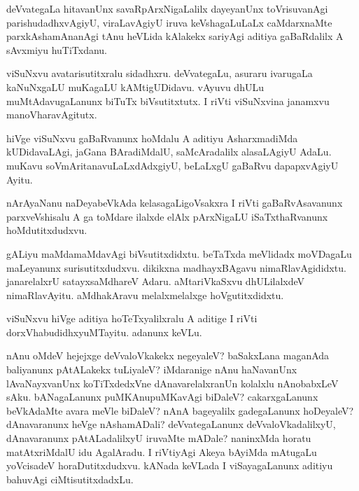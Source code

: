 \begin{mng}
deVvategaLa hitavanUnx savaRpArxNigaLalilx dayeyanUnx toVrisuvanAgi parishudadhxvAgiyU, viraLavAgiyU iruva keVshagaLuLaLx caMdarxnaMte parxkAshamAnanAgi tAnu heVLida kAlakekx sariyAgi aditiya gaBaRdalilx A sAvxmiyu huTiTxdanu.
\end{mng}

\begin{mng}
viSuNxvu avatarisutitxralu sidadhxru. deVvategaLu, asuraru ivarugaLa kaNuNxgaLU muKagaLU kAMtigUDidavu. vAyuvu dhULu muMtAdavugaLanunx biTuTx biVsutitxtutx. I riVti viSuNxvina janamxvu manoVharavAgitutx.
\end{mng}

\begin{mng}
hiVge viSuNxvu gaBaRvanunx hoMdalu A aditiyu AsharxmadiMda kUDidavaLAgi, jaGana BAradiMdalU, saMcAradalilx alasaLAgiyU AdaLu. muKavu soVmAritanavuLaLxdAdxgiyU, beLaLxgU gaBaRvu dapapxvAgiyU Ayitu.
\end{mng}

\begin{mng}
nArAyaNanu naDeyabeVkAda kelasagaLigoVsakxra I riVti gaBaRvAsavanunx parxveVshisalu A ga toMdare ilalxde elAlx pArxNigaLU iSaTxthaRvanunx hoMdutitxdudxvu.
\end{mng}

\begin{mng}
gALiyu maMdamaMdavAgi biVsutitxdidxtu. beTaTxda meVlidadx moVDagaLu maLeyanunx surisutitxdudxvu. dikikxna madhayxBAgavu nimaRlavAgididxtu. janarelalxrU satayxsaMdhareV Adaru. aMtariVkaSxvu dhULilalxdeV nimaRlavAyitu. aMdhakAravu melalxmelalxge hoVgutitxdidxtu.
\end{mng}

\begin{mng}
viSuNxvu hiVge aditiya hoTeTxyalilxralu A aditige I riVti dorxVhabudidhxyuMTayitu. adanunx keVLu.
\end{mng}

\begin{mng}
nAnu oMdeV hejejxge deVvaloVkakekx negeyaleV? baSakxLana maganAda baliyanunx pAtALakekx tuLiyaleV? iMdaranige nAnu haNavanUnx lAvaNayxvanUnx koTiTxdedxVne dAnavarelalxranUn kolalxlu nAnobabxLeV sAku. bANagaLanunx puMKAnupuMKavAgi biDaleV? cakarxgaLanunx beVkAdaMte avara meVle biDaleV? nAnA bageyalilx gadegaLanunx hoDeyaleV? dAnavaranunx heVge nAshamADali? deVvategaLanunx deVvaloVkadalilxyU, dAnavaranunx pAtALadalilxyU iruvaMte mADale? naninxMda horatu matAtxriMdalU idu AgalAradu. I riVtiyAgi Akeya bAyiMda mAtugaLu yoVcisadeV horaDutitxdudxvu. kANada keVLada I viSayagaLanunx aditiyu bahuvAgi ciMtisutitxdadxLu.
\end{mng}

